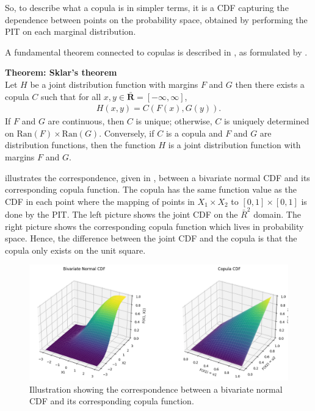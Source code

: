 So, to describe what a copula is in simpler terms, it is a \gls{CDF} capturing the dependence between points on the probability space, obtained by performing the \gls{PIT} on each marginal distribution. 

A fundamental theorem connected to copulas is described in , as formulated by \citet[p.~18]{Nelsen2006}. 
\begin{theorem}\label{the:Sklars}
        \textbf{Theorem: Sklar's theorem} \\
        Let $H$ be a joint distribution function with margins $F$ and $G$ then there exists a copula $C$ such that for all $x,y \in \bar{\mathbf{R}} = \left[-\infty, \infty \right]$, 
        \begin{align}
            H(x,y) = C(F(x), G(y)). \label{eq:Sklar}
        \end{align}
        If $F$ and $G$ are continuous, then $C$ is unique; otherwise, $C$ is uniquely determined on $\mathrm{Ran}(F)\times\mathrm{Ran}(G)$. Conversely, if $C$ is a copula and $F$ and $G$ are distribution functions, then the function $H$ is a joint distribution function with margins $F$ and $G$.
\end{theorem}

 illustrates the correspondence, given in , between a bivariate normal \gls{CDF} and its corresponding copula function. The copula has the same function value as the \gls{CDF} in each point where the mapping of points in $X_1\times X_2$ to $[0,1]\times[0,1]$ is done by the \gls{PIT}. The left picture shows the joint \gls{CDF} on the $\bar{R}^2$ domain. The right picture shows the corresponding copula function which lives in probability space. Hence, the difference between the joint \gls{CDF} and the copula is that the copula only exists on the unit square. 

\begin{figure}
    \centering
    \includegraphics[width=1\linewidth]{3Theory/pictures/Copula.png}
    \caption{Illustration showing the correspondence between a bivariate normal \gls{CDF} and its corresponding copula function.}
    \label{fig:CDFtoCopula}
\end{figure}

